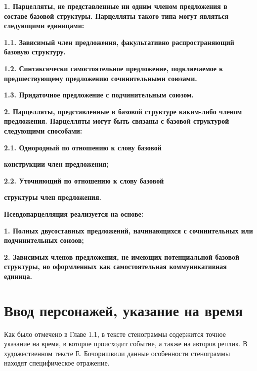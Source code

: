 \documentclass{kursa4}
\begin{document}
{{      {\bfseries\color[rgb]{0.2,0.2,0.2}
      \textmd{}\textmd{1. Парцелляты, не представленные ни одним членом
      предложения в составе базовой структуры. Парцелляты такого типа могут
      являться следующими единицами:}}

      {\bfseries\color[rgb]{0.2,0.2,0.2}
      \textmd{1.1. Зависимый член предложения, факультативно
      распространяющий базовую структуру.}}

      {\bfseries\color[rgb]{0.2,0.2,0.2}
      \textmd{1.2. }\textmd{Синтаксически самостоятельное предложение,
      подключаемое к предшествующему предложению сочинительными союзами.}}

      {\bfseries\color[rgb]{0.2,0.2,0.2}
      \textmd{1.3. Придаточное предложение с подчинительным союзом.}}

      {\bfseries\color[rgb]{0.2,0.2,0.2}
      \textmd{2. Парцелляты, представленные в базовой структуре каким-либо
      членом предложения. Парцелляты могут быть связаны с базовой структурой
      следующими способами:}}

      {\bfseries\color[rgb]{0.2,0.2,0.2}
      \textmd{2.1. Однородный по отношению к слову базовой}}

      {\bfseries\color[rgb]{0.2,0.2,0.2}
      \textmd{конструкции член предложения;}}

      {\bfseries\color[rgb]{0.2,0.2,0.2}
      \textmd{2.2. Уточняющий по отношению к слову базовой}}

      {\bfseries\color[rgb]{0.2,0.2,0.2}
      \textmd{структуры член предложения.}}

      {\bfseries\color[rgb]{0.2,0.2,0.2}
      \textmd{}Псевдопарцелляция\textmd{ реализуется на основе:}}

      {\bfseries\color[rgb]{0.2,0.2,0.2}
      \textmd{1. }\textmd{Полных двусоставных п}\textmd{редложений,
      начинающихся с сочинительных или подчинительных союзов;}}

      {\bfseries\color[rgb]{0.2,0.2,0.2}
      \textmd{2. }\textmd{Зависимых членов предложения, }\textmd{не
      имеющих потенциальной базовой структуры, }\textmd{но оформленных как
      самостоятельная коммуникативная единица. }}




    \section{Ввод персонажей, указание на время}   
      Как было отмечено в Главе 1.1, в тексте стенограммы содержится точное указание на время, в которое происходит событие, а также на авторов реплик. В художественном тексте Е. Бочоришвили данные особенности стенограммы находят специфическое отражение. 

}}
\end{document}

